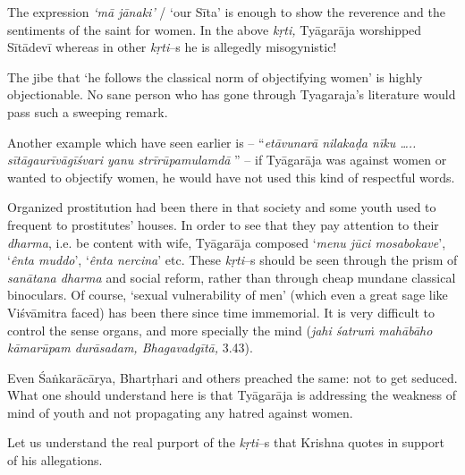 The expression \textit{‘mā jānaki’} / ‘our Sīta’ is enough to show the reverence and the sentiments of the saint for women. In the above \textit{kṛti,} Tyāgarāja worshipped Sītādevī whereas in other \textit{kṛti}–s he is allegedly misogynistic! 

The jibe that ‘he follows the classical norm of objectifying women’ is highly objectionable. No sane person who has gone through Tyagaraja’s literature would pass such a sweeping remark. 

Another example which have seen earlier is – “\textit{etāvunarā nilakaḍa nīku ….. sītāgaurīvāgīśvari yanu strīrūpamulamdā} ” – if Tyāgarāja was against women or wanted to objectify women, he would have not used this kind of respectful words.

Organized prostitution had been there in that society and some youth used to frequent to prostitutes’ houses. In order to see that they pay attention to their \textit{dharma}, i.e. be content with wife, Tyāgarāja composed ‘\textit{menu jūci mosabokave}’, ‘\textit{ênta muddo}’, ‘\textit{ênta nercina}’ etc. These \textit{kṛti}–s should be seen through the prism of \textit{sanātana dharma} and social reform, rather than through cheap mundane classical binoculars. Of course, ‘sexual vulnerability of men’ (which even a great sage like Viśvāmitra faced) has been there since time immemorial. It is very difficult to control the sense organs, and more specially the mind (\textit{jahi śatruṁ mahābāho kāmarūpam durāsadam, Bhagavadgītā,} 3.43).

Even Śaṅkarācārya, Bhartṛhari and others preached the same: not to get seduced. What one should understand here is that Tyāgarāja is addressing the weakness of mind of youth and not propagating any hatred against women.

Let us understand the real purport of the \textit{kṛti}–s that Krishna quotes in support of his allegations.

